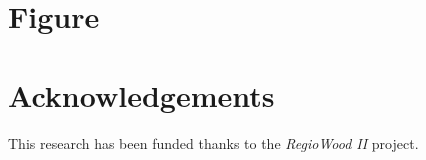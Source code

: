 \documentclass[3p,procedia]{elsarticle}
\begin{document}
\section{Figure}


	


\section{Acknowledgements}

This research has been funded thanks to the \textit{RegioWood II} project.

%

\end{document}
